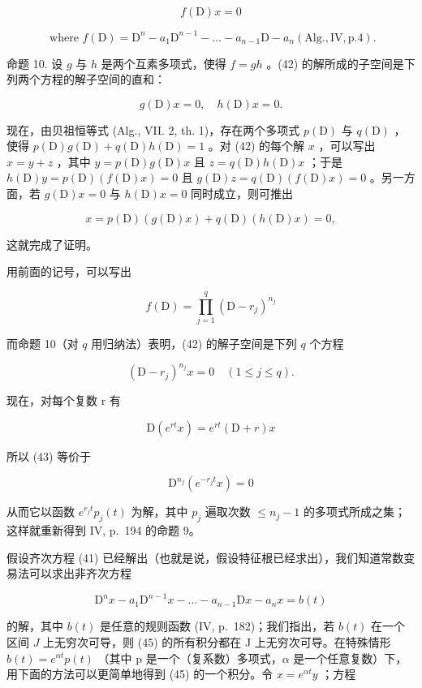 \[
f (\mathrm{D}) x = 0\tag{42}
\]

\[
\text { where } f (\mathrm{D}) = \mathrm{D} ^ {n} - a _ {1} \mathrm{D} ^ {n - 1} - \dots - a _ {n - 1} \mathrm{D} - a _ {n} (\mathrm{Alg}., \mathrm{IV}, \mathrm{p}. 4).
\]

命题 10. 设 \(g\) 与 \(h\) 是两个互素多项式，使得 \(f = gh\) 。(42) 的解所成的子空间是下列两个方程的解子空间的直和：

\[
g (\mathrm{D}) x = 0, \quad h (\mathrm{D}) x = 0.
\]

现在，由贝祖恒等式 (Alg., VII. 2, th. 1)，存在两个多项式 \(p(\mathrm{D})\) 与 \(q(\mathrm{D})\) ，使得 \(p(\mathrm{D})g(\mathrm{D}) + q(\mathrm{D})h(\mathrm{D}) = 1\) 。对 (42) 的每个解 \(x\) ，可以写出 \(x = y + z\) ，其中 \(y = p(\mathrm{D})g(\mathrm{D})x\) 且 \(z = q(\mathrm{D})h(\mathrm{D})x\) ；于是 \(h(\mathrm{D})y = p(\mathrm{D})(f(\mathrm{D})x) = 0\) 且 \(g(\mathrm{D})z = q(\mathrm{D})(f(\mathrm{D})x) = 0\) 。另一方面，若 \(g(\mathrm{D})x = 0\) 与 \(h(\mathrm{D})x = 0\) 同时成立，则可推出

\[
x = p (\mathrm{D}) (g (\mathrm{D}) x) + q (\mathrm{D}) (h (\mathrm{D}) x) = 0,
\]

这就完成了证明。

用前面的记号，可以写出

\[
f (\mathrm{D}) = \prod_ {j = 1} ^ {q} (\mathrm{D} - r _ {j}) ^ {n _ {j}}
\]

而命题 10（对 \(q\) 用归纳法）表明，(42) 的解子空间是下列 \(q\) 个方程

\[
(\mathrm{D} - r _ {j}) ^ {n _ {j}} x = 0 \quad (1 \leqslant j \leqslant q).\tag{43}
\]

现在，对每个复数 r 有

\[
\mathrm{D} (e ^ {r t} x) = e ^ {r t} (\mathrm{D} + r) x\tag{44}
\]

所以 (43) 等价于

\[
\mathrm{D} ^ {n _ {j}} \left(e ^ {- r _ {j} t} x\right) = 0
\]

从而它以函数 \(e^{r_{j}t} p_{j}(t)\) 为解，其中 \(p_{j}\) 遍取次数 \(\leqslant n_{j}-1\) 的多项式所成之集；这样就重新得到 IV, p.~194 的命题 9。

假设齐次方程 (41) 已经解出（也就是说，假设特征根已经求出），我们知道常数变易法可以求出非齐次方程

\[
\mathrm{D} ^ {n} x - a _ {1} \mathrm{D} ^ {n - 1} x - \dots - a _ {n - 1} \mathrm{D} x - a _ {n} x = b (t)\tag{45}
\]

的解，其中 \(b(t)\) 是任意的规则函数 (IV, p.~182)；我们指出，若 \(b(t)\) 在一个区间 \(J\) 上无穷次可导，则 (45) 的所有积分都在 J 上无穷次可导。在特殊情形 \(b(t) = e^{\alpha t} p(t)\) （其中 p 是一个（复系数）多项式，\(\alpha\) 是一个任意复数）下，用下面的方法可以更简单地得到 (45) 的一个积分。令 \(x = e^{\alpha t} y\) ；方程

